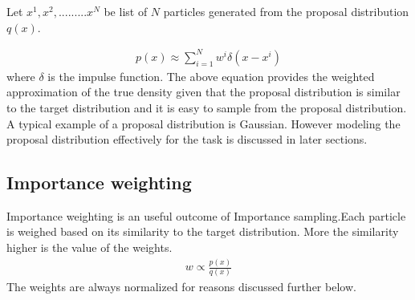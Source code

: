 Let ${x^{1},x^{2},.........x^{N}}$ be list of ${N}$ particles generated from the proposal distribution ${q(x)}$.

\begin{gather} \label{Sample}
    p(x) \approx \sum_{i = 1}^{N} w^{i}\delta (x - x^{i})  
\end{gather} 
where $\delta$ is the impulse function. The above equation provides the weighted approximation of the true density given that the proposal distribution is similar to the target distribution and it is easy to sample from the proposal distribution. A typical example of a proposal distribution is Gaussian. However modeling the proposal distribution effectively for the task is discussed in later sections.

\subsection{Importance weighting}
Importance weighting is an useful outcome of Importance sampling.Each particle is weighed based on its similarity to the target distribution. More the similarity higher is the value of the weights. 
\begin{gather} \label{ImportanceWeigting}
    w \propto \frac{p(x)}{q(x)} 
\end{gather}
The weights are always normalized for reasons discussed further below.

